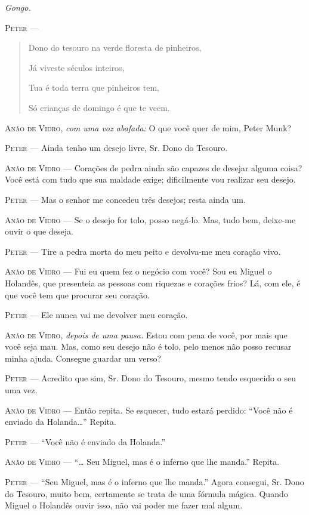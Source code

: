 \emph{Gongo.}

\textsc{Peter} ---

\begin{quote}
Dono do tesouro na verde floresta de pinheiros,

Já viveste séculos inteiros,

Tua é toda terra que pinheiros tem,

Só crianças de domingo é que te veem.
\end{quote}

\textsc{Anão de Vidro}, \emph{com uma voz abafada:} O que você quer de mim, Peter
Munk?

\textsc{Peter} --- Ainda tenho um desejo livre, Sr. Dono do Tesouro.

\textsc{Anão de Vidro} --- Corações de pedra ainda são capazes de desejar alguma
coisa? Você está com tudo que sua maldade exige; dificilmente vou
realizar seu desejo.

\textsc{Peter} --- Mas o senhor me concedeu três desejos; resta ainda um.

\textsc{Anão de Vidro} --- Se o desejo for tolo, posso negá-lo. Mas, tudo bem,
deixe-me ouvir o que deseja.

\textsc{Peter} --- Tire a pedra morta do meu peito e devolva-me meu coração vivo.

\textsc{Anão de Vidro} --- Fui eu quem fez o negócio com você? Sou eu Miguel o
Holandês, que presenteia as pessoas com riquezas e corações frios? Lá,
com ele, é que você tem que procurar seu coração.

\textsc{Peter} --- Ele nunca vai me devolver meu coração.

\textsc{Anão de Vidro}, \emph{depois de uma pausa.} Estou com pena de você, por
mais que você seja mau. Mas, como seu desejo não é tolo, pelo menos não
posso recusar minha ajuda. Consegue guardar um verso?

\textsc{Peter} --- Acredito que sim, Sr. Dono do Tesouro, mesmo tendo esquecido o
seu uma vez.

\textsc{Anão de Vidro} --- Então repita. Se esquecer, tudo estará perdido: ``Você
não é enviado da Holanda\ldots{}'' Repita.

\textsc{Peter} --- ``Você não é enviado da Holanda.''

\textsc{Anão de Vidro} --- ``\ldots{} Seu Miguel, mas é o inferno que lhe manda.''
Repita.

\textsc{Peter} --- ``Seu Miguel, mas é o inferno que lhe manda.'' Agora consegui,
Sr. Dono do Tesouro, muito bem, certamente se trata de uma fórmula
mágica. Quando Miguel o Holandês ouvir isso, não vai poder me fazer mal
algum.

